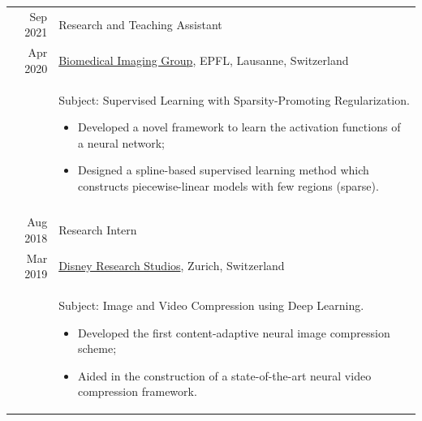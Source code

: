 \documentclass[a4paper,11pt]{article}
\def\datespace{-2pt}
\def\title-main-sep{4pt}
\def\tabwidth{13cm}
\begin{document}
\begin{tabular}{r|p{\tabwidth}}

      {\small Sep 2021} 	& Research and Teaching Assistant \\[\datespace]
      {\small Apr 2020} 	& {\small \href{https://bigwww.epfl.ch/}{Biomedical Imaging Group}, EPFL, Lausanne, Switzerland} \\[\title-main-sep]
      & {
        \parbox[t]{\tabwidth}{
        \footnotesize Subject: Supervised Learning with Sparsity-Promoting Regularization.
        \begin{itemize}[topsep=0pt, partopsep=0pt, parsep=0pt, itemsep=0pt, leftmargin=*, after=\vspace{0pt}]
          \item Developed a novel framework to learn the activation functions of a neural network;
          \item Designed a spline-based supervised learning method which constructs piecewise-linear models with few regions (sparse).
        \end{itemize}
        }
      } \\
      \multicolumn{2}{c}{} \\

      {\small Aug 2018} & Research Intern \\[\datespace]
      {\small Mar 2019} &  {\small \href{https://studios.disneyresearch.com/}{Disney Research Studios}, Zurich, Switzerland}\\[\title-main-sep]
			& {
        \parbox[t]{\tabwidth}{
        \footnotesize Subject: Image and Video Compression using Deep Learning.
        \begin{itemize}[topsep=0pt, partopsep=0pt, parsep=0pt, itemsep=0pt, leftmargin=*, after=\vspace{0pt}]
          \item Developed the first content-adaptive neural image compression scheme;
          \item Aided in the construction of a state-of-the-art neural video compression framework.
        \end{itemize}
        }
      }
    \end{tabular}

  
\end{document}

